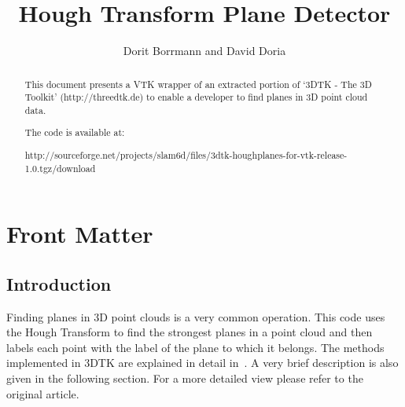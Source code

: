 \documentclass{InsightArticle}
\title{Hough Transform Plane Detector}
\author{Dorit Borrmann and David Doria}
\newcommand{\IJhandlerIDnumber}{3250}
\begin{document}
\IJhandlefooter{\IJhandlerIDnumber}


\ifpdf
\else
\fi


\maketitle


\ifhtml
\chapter*{Front Matter\label{front}}
\fi

\begin{abstract}
\noindent
This document presents a VTK wrapper of an extracted portion of `3DTK - The 3D Toolkit' (http://threedtk.de) to enable a developer to find planes in 3D point cloud data.

\vspace{14pt}

\noindent The code is available at:

\noindent
http://sourceforge.net/projects/slam6d/files/3dtk-houghplanes-for-vtk-release-1.0.tgz/download

\end{abstract}

\IJhandlenote{\IJhandlerIDnumber}

\tableofcontents

\section{Introduction}
Finding planes in 3D point clouds is a very common operation. This code uses the
Hough Transform to find the strongest planes in a point cloud and then labels
each point with the label of the plane to which it belongs. The methods
implemented in 3DTK are explained in detail in~\cite{Borrmann:2011}. A very
brief description is also given in the following section. For a more detailed view please refer to
the original article.
\end{document}

